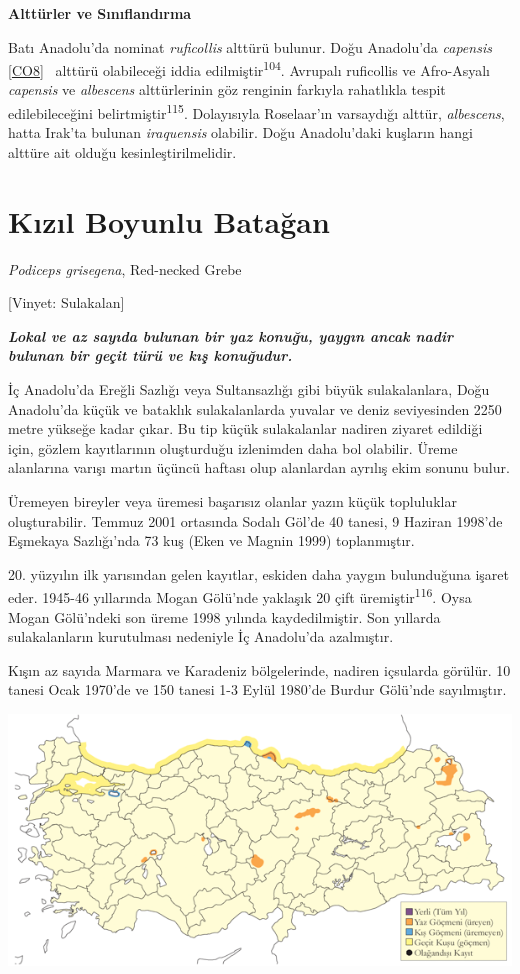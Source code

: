 \documentclass[
  letterpaper,
  DIV=11,
  numbers=noendperiod]{scrreprt}
\begin{document}
\textbf{Alttürler ve Sınıflandırma}

Batı Anadolu'da nominat \emph{ruficollis} alttürü bulunur. Doğu
Anadolu'da \emph{capensis} \hyperref[_msocom_8]{{[}CO8{]}}~ alttürü
olabileceği iddia edilmiştir\textsuperscript{104}. Avrupalı ruficollis
ve Afro-Asyalı \emph{capensis} ve \emph{albescens} alttürlerinin göz
renginin farkıyla rahatlıkla tespit edilebileceğini
belirtmiştir\textsuperscript{115}. Dolayısıyla Roselaar'ın varsaydığı
alttür, \emph{albescens}, hatta Irak'ta bulunan \emph{iraquensis}
olabilir. Doğu Anadolu'daki kuşların hangi alttüre ait olduğu
kesinleştirilmelidir.

\section{Kızıl Boyunlu Batağan}\label{kux131zux131l-boyunlu-bataux11fan}

\emph{Podiceps grisegena}, Red-necked Grebe

{[}Vinyet: Sulakalan{]}

\textbf{\emph{Lokal ve az sayıda bulunan bir yaz konuğu, yaygın ancak
nadir bulunan bir geçit türü ve kış konuğudur.}}

İç Anadolu'da Ereğli Sazlığı veya Sultansazlığı gibi büyük
sulakalanlara, Doğu Anadolu'da küçük ve bataklık sulakalanlarda yuvalar
ve deniz seviyesinden 2250 metre yükseğe kadar çıkar. Bu tip küçük
sulakalanlar nadiren ziyaret edildiği için, gözlem kayıtlarının
oluşturduğu izlenimden daha bol olabilir. Üreme alanlarına varışı martın
üçüncü haftası olup alanlardan ayrılış ekim sonunu bulur.

Üremeyen bireyler veya üremesi başarısız olanlar yazın küçük topluluklar
oluşturabilir. Temmuz 2001 ortasında Sodalı Göl'de 40 tanesi, 9 Haziran
1998'de Eşmekaya Sazlığı'nda 73 kuş (Eken ve Magnin 1999) toplanmıştır.

20. yüzyılın ilk yarısından gelen kayıtlar, eskiden daha yaygın
bulunduğuna işaret eder. 1945-46 yıllarında Mogan Gölü'nde yaklaşık 20
çift üremiştir\textsuperscript{116}. Oysa Mogan Gölü'ndeki son üreme
1998 yılında kaydedilmiştir. Son yıllarda sulakalanların kurutulması
nedeniyle İç Anadolu'da azalmıştır.

Kışın az sayıda Marmara ve Karadeniz bölgelerinde, nadiren içsularda
görülür. 10 tanesi Ocak 1970'de ve 150 tanesi 1-3 Eylül 1980'de Burdur
Gölü'nde sayılmıştır.

\includegraphics{images/harita_Page_052.png}
\end{document}
